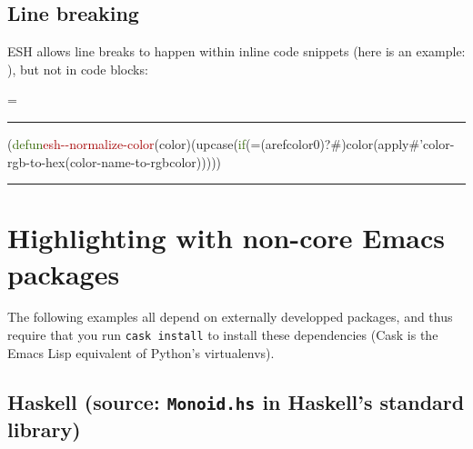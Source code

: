 \documentclass{article}
\makeatletter
\newcommand*{\ESHFontSize}{}
\newcommand*{\ESHFontFamily}{\ttfamily}
\newcommand*{\ESHInlineFontSize}{\ESHFontSize}
\newcommand*{\ESHInlineFontFamily}{\ESHFontFamily}
\newcommand*{\ESHInlineFont}{\ESHInlineFontSize\ESHInlineFontFamily}
\newcommand*{\ESHBlockFontSize}{\ESHFontSize}
\newcommand*{\ESHBlockFontFamily}{\ESHFontFamily}
\newcommand*{\ESHBlockFont}{\ESHBlockFontSize\ESHBlockFontFamily}
\newcommand*{\ESHFallbackFontFamily}{\ESHFontFamily}
\newcommand*{\ESHFallbackFont}{\ESHFallbackFontFamily}
\newcommand*{\ESHNoHyphens}{\hyphenpenalty=10000}
\newcommand*{\ESHConstantSpace}{\spaceskip=\fontdimen2\font\xspaceskip=0pt}
\newcommand*{\ESHCenterInWidthOf}[2]
  {\settowidth\ESHtempdim{#1}%
   \makebox[\ESHtempdim][c]{#2}}
\DeclareRobustCommand*{\ESHText}[1]{\ifmmode{\textnormal{#1}}\else{#1}\fi}
\newcommand*{\ESHIfFontChar}[1]
  {\iffontchar\font`#1{#1}\else{\ESHFallbackFont#1}\fi}
\def\ESHWithFallback#1{\ESHFallbackFont#1}}
\def\ESHWithFallback#1{\ESHIfFontChar{#1}}}}
\def\ESHWithFallback#1{%
     \ifnum\XeTeXfonttype\font>0%
       \ESHIfFontChar{#1}%
     \else%
       \setbox0=\hbox{\tracinglostchars=0\kern1sp#1\expandafter}%
       \ifnum\lastkern=1{\ESHFallbackFont#1}\else{#1}\fi
     \fi}}
\DeclareRobustCommand*{\ESHInlineSpecialChar}[1]
  {{\ESHInlineFontFamily\ESHWithFallback{#1}}}
\DeclareRobustCommand*{\ESHBlockSpecialChar}[1]
  {{\ESHCenterInWidthOf{\ESHBlockFontFamily{a}}{\ESHBlockFontFamily\ESHWithFallback{#1}}}}
\DeclareRobustCommand*{\ESHInlineUnicodeSubstitution}[1]
  {{\ESHInlineFontFamily#1}}
\DeclareRobustCommand*{\ESHBlockUnicodeSubstitution}[1]
  {{\ESHCenterInWidthOf{\ESHBlockFontFamily{a}}{\ESHBlockFontFamily#1}}}
\newlength{\ESHCurFontSize}
\newcommand*{\ESHSetCurFontSize}{\setlength{\ESHCurFontSize}{\f@size pt}}
\DeclareRobustCommand*{\ESHInlineRaise}[2]
  {\ESHSetCurFontSize\raisebox{#1\ESHCurFontSize}{\relsize{-2}#2}}
\DeclareRobustCommand*{\ESHBlockRaise}[2]
  {\rlap{\ESHInlineRaise{#1}{#2}}\hphantom{#2}}
\newlength{\ESHBaselineskip}
\DeclareRobustCommand*{\ESHBlockStrut}[1]
  {\rule{0pt}{#1\ESHBaselineskip}}
\newcommand*{\ESHInlineSlantItalic}[1]{\textit{#1}}
\newcommand*{\ESHBlockSlantItalic}[1]{{\itshape{#1}}} %
\newcommand*{\ESHBreakingSpace}{\ }
\newcommand*{\ESHNonbreakingSpace}{\nobreakspace}
\let\ESHSpecialChar\ignorespaces%
\let\ESHUnicodeSubstitution\ignorespaces%
\let\ESHRaise\ignorespaces%
\let\ESHBol\ignorespaces%
\let\ESHEmptyLine\ignorespaces%
\let\ESHEol\ignorespaces%
\let\ESHSpace\ignorespaces%
\let\ESHDash\ignorespaces%
\let\ESHSlantItalic\ignorespaces%
\DeclareRobustCommand*{\ESHInlineInternalSetup}
  {\def\ESHSpecialChar{\ESHInlineSpecialChar}\def\ESHUnicodeSubstitution{\ESHInlineUnicodeSubstitution}%
   \def\ESHRaise{\ESHInlineRaise}\def\ESHSlantItalic{\ESHInlineSlantItalic}%
   \def\ESHStrut{\relax}\def\ESHBol{\relax}\def\ESHEmptyLine{\mbox{}}\def\ESHEol{\newline}%
   \def\ESHSpace{\ESHBreakingSpace}%
   \def\ESHDash{-}}
\DeclareRobustCommand*{\ESHBlockInternalSetup}
  {\def\ESHSpecialChar{\ESHBlockSpecialChar}\def\ESHUnicodeSubstitution{\ESHBlockUnicodeSubstitution}%
   \def\ESHRaise{\ESHBlockRaise}\def\ESHSlantItalic{\ESHBlockSlantItalic}%
   \setlength{\ESHBaselineskip}{\baselineskip}\def\ESHStrut{\ESHBlockStrut}%
   \def\ESHBol{\-}\def\ESHEmptyLine{\mbox{}}\def\ESHEol{\newline}%
   \def\ESHSpace{\ESHNonbreakingSpace}\def\ESHDash{\hbox{-}\nobreak}}
\newcommand*{\ESHInlineBasicSetup}
  {\leavevmode\ESHNoHyphens\ESHInlineFont}
\newcommand*{\ESHBlockBasicSetup}
  {\setlength{\parindent}{0pt}\raggedright\ESHNoHyphens%
   \ESHBlockFont\ESHConstantSpace}
\newcommand*{\ESHHook}{}
\newcommand*{\ESHInlineHook}{\ESHHook}
\newcommand*{\ESHBlockHook}{\ESHHook}
\DeclareRobustCommand*{\ESHInline}[1]
  {\bgroup\ESHText{\ESHInlineInternalSetup\ESHInlineBasicSetup\ESHInlineHook#1}\egroup}
\newlength{\ESHSkip}
\newcommand*{\ESHNoBreakAddVSpace}[1]{\addpenalty{\@M}\addvspace{#1}}
\newenvironment{ESHBlock}
  {\par\ESHNoBreakAddVSpace{\ESHSkip}\bgroup\ESHBlockInternalSetup\ESHBlockBasicSetup\ESHBlockHook}
  {\par\egroup\addvspace{\ESHSkip}}
\renewcommand{\ESHFontFamily}{\UbuntuMono}
\renewcommand{\ESHFallbackFontFamily}{\XITSMath}
\newcommand{\angles}[1]{$\langle\,$#1$\,\rangle$}
\DeclareRobustCommand*{\ESHInline}[1]
  {{\ESHText{\ESHInlineInternalSetup\ESHInlineBasicSetup\angles{#1}}}}
\renewenvironment{ESHBlock}{%
  \par\ESHNoBreakAddVSpace{\ESHSkip}\bgroup\ESHBlockInternalSetup\ESHBlockBasicSetup%
  \hrule\addvspace{0.5em}%
}{%
  \par\egroup\addvspace{0.5em}\hrule\addvspace{2\ESHSkip}%
}
\makeatother
\begin{document}
\subsection*{Line breaking}

ESH allows line breaks to happen within inline code snippets (here is an example: \ESHInline{\ESHBol{}\textcolor[HTML]{346604}{private}\ESHSpace{}\textcolor[HTML]{346604}{static}\ESHSpace{}\textcolor[HTML]{346604}{volatile}\ESHSpace{}\textcolor[HTML]{204A87}{int}\ESHSpace{}\textcolor[HTML]{B35000}{counter}\ESHSpace{}=\ESHSpace{}0}), but not in code blocks:

\begin{ESHBlock}
\ESHBol{}(\textcolor[HTML]{346604}{defun}\ESHSpace{}\textcolor[HTML]{A40000}{esh\ESHDash{}\ESHDash{}normalize\ESHDash{}color}\ESHSpace{}(color)\ESHSpace{}(upcase\ESHSpace{}(\textcolor[HTML]{346604}{if}\ESHSpace{}(=\ESHSpace{}(aref\ESHSpace{}color\ESHSpace{}0)\ESHSpace{}?\#)\ESHSpace{}color\ESHSpace{}(apply\ESHSpace{}\#{'}color\ESHDash{}rgb\ESHDash{}to\ESHDash{}hex\ESHSpace{}(color\ESHDash{}name\ESHDash{}to\ESHDash{}rgb\ESHSpace{}color)))))
\end{ESHBlock}


\section*{Highlighting with non-core Emacs packages}

The following examples all depend on externally developped packages, and thus
require that you run \texttt{cask install} to install these dependencies (Cask
is the Emacs Lisp equivalent of Python's virtualenvs).

\subsection*{Haskell (source: \texttt{Monoid.hs} in Haskell's standard library)}
\end{document}
